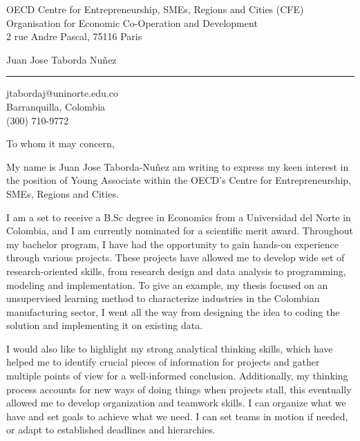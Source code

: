 \documentclass[11pt]{letter}
\begin{document}
\begin{letter}{OECD Centre for Entrepreneurship, SMEs, Regions and Cities (CFE) \\
Organisation for Economic Co-Operation and Development \\
2 rue Andre Pascal, 75116 Paris} 

\begin{flushleft}
\large Juan Jose Taborda Nuñez \\ 
\vspace{20pt} \hrule height 1pt 
jtabordaj@uninorte.edu.co \\ Barranquilla, Colombia\\ (300) 710-9772
\end{flushleft} 
\vspace{30pt}

\signature{ \vspace{40pt} Juan Jose Taborda Nuñez \\ Economist}


\opening{To whom it may concern,} 

My name is Juan Jose Taborda-Nuñez am writing to express my keen interest in the position of Young Associate within the OECD's Centre for Entrepreneurship, SMEs, Regions and Cities.

I am a set to receive a B.Sc degree in Economics from a Universidad del Norte in Colombia, and I am currently nominated for a scientific merit award. Throughout my bachelor program, I have had the opportunity to gain hands-on experience through various projects. These projects have allowed me to develop wide set of research-oriented skills, from research design and data analysis to programming, modeling and implementation. To give an example, my thesis focused on an unsupervised learning method to characterize industries in the Colombian manufacturing sector, I went all the way from designing the idea to coding the solution and implementing it on existing data.

I would also like to highlight my strong analytical thinking skills, which have helped me to identify crucial pieces of information for projects and gather multiple points of view for a well-informed conclusion. Additionally, my thinking process accounts for new ways of doing things when projects stall, this eventually allowed me to develop organization and teamwork skills. I can organize what we have and set goals to achieve what we need. I can set teams in motion if needed, or adapt to established deadlines and hierarchies.


\end{letter}
\end{document}
